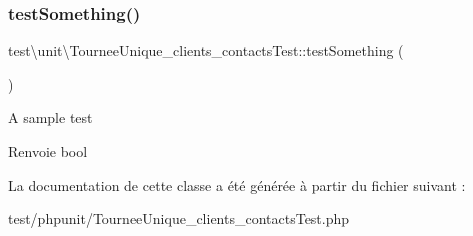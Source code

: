 \subsubsection{\texorpdfstring{test\+Something()}{testSomething()}}
{\footnotesize\ttfamily test\textbackslash{}unit\textbackslash{}\+Tournee\+Unique\+\_\+clients\+\_\+contacts\+Test\+::test\+Something (\begin{DoxyParamCaption}{ }\end{DoxyParamCaption})}

A sample test \begin{DoxyReturn}{Renvoie}
bool 
\end{DoxyReturn}


La documentation de cette classe a été générée à partir du fichier suivant \+:\begin{DoxyCompactItemize}
\item 
test/phpunit/Tournee\+Unique\+\_\+clients\+\_\+contacts\+Test.\+php\end{DoxyCompactItemize}
